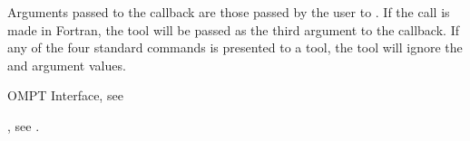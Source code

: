 Arguments passed to the callback are those passed by the user to
. If the call is made in Fortran, the tool
will be passed  as the third argument to the callback. If
any of the four standard commands is presented to a tool, the tool
will ignore the  and  argument values.



\begin{crossrefs}
\item OMPT Interface, see
\item {}, see
.
\end{crossrefs}

